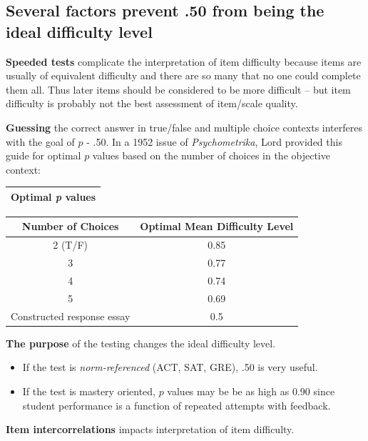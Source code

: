 \documentclass[
  english,
]{book}
\providecommand{\tightlist}{%
  \setlength{\itemsep}{0pt}\setlength{\parskip}{0pt}}
\begin{document}
\hypertarget{several-factors-prevent-.50-from-being-the-ideal-difficulty-level}{%
\subsection{Several factors prevent .50 from being the ideal difficulty level}\label{several-factors-prevent-.50-from-being-the-ideal-difficulty-level}}

\textbf{Speeded tests} complicate the interpretation of item difficulty because items are usually of equivalent difficulty and there are so many that no one could complete them all. Thus later items should be considered to be more difficult -- but item difficulty is probably not the best assessment of item/scale quality.

\textbf{Guessing} the correct answer in true/false and multiple choice contexts interferes with the goal of \(p\) - .50. In a 1952 issue of \emph{Psychometrika}, Lord provided this guide for optimal \(p\) values based on the number of choices in the objective context:

\begin{longtable}[]{@{}l@{}}
\toprule
Optimal \emph{p} values\tabularnewline
\midrule
\endhead
\bottomrule
\end{longtable}

\begin{longtable}[]{@{}cc@{}}
\toprule
Number of Choices & Optimal Mean Difficulty Level\tabularnewline
\midrule
\endhead
2 (T/F) & 0.85\tabularnewline
3 & 0.77\tabularnewline
4 & 0.74\tabularnewline
5 & 0.69\tabularnewline
Constructed response essay & 0.5\tabularnewline
\bottomrule
\end{longtable}

\textbf{The purpose} of the testing changes the ideal difficulty level.

\begin{itemize}
\tightlist
\item
  If the test is \emph{norm-referenced} (ACT, SAT, GRE), .50 is very useful.
\item
  If the test is mastery oriented, \(p\) values may be be as high as 0.90 since student performance is a function of repeated attempts with feedback.
\end{itemize}

\textbf{Item intercorrelations} impacts interpretation of item difficulty.
\end{document}
